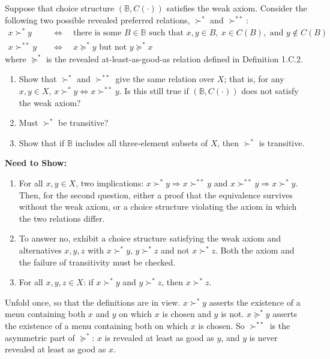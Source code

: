 \documentclass[12pt]{article}
\newenvironment{statement}{\par\medskip}{\par\medskip}
\newenvironment{nts}
  {\par\medskip\Needspace{3\baselineskip}%
   \noindent\textbf{Need to Show:}\par\nobreak\smallskip}
  {\par\medskip}
\begin{document}
\begin{statement}
  Suppose that choice structure $(\mathbb B,C(\cdot))$ satisfies the weak axiom.
  Consider the following two possible revealed preferred relations, $\succ^{*}$
  and $\succ^{**}$:
  \[
  \begin{aligned}
    x\succ^{*}y \quad&\Longleftrightarrow\quad
    \text{there is some }B\in\mathbb B\text{ such that }x,y\in B,\ x\in C(B),
    \text{ and } y\notin C(B)\\
    x\succ^{**}y \quad&\Longleftrightarrow\quad
    x\succeq^{*}y\text{ but not }y\succeq^{*}x
  \end{aligned}
  \]
  where $\succeq^{*}$ is the revealed at-least-as-good-as relation defined in
  Definition 1.C.2.
  \begin{enumerate}[label=(\alph*),leftmargin=2.4em,topsep=.3em,itemsep=.25em]
    \item Show that $\succ^{*}$ and $\succ^{**}$ give the same relation over $X$;
    that is, for any $x,y\in X$, $x\succ^{*}y\iff x\succ^{**}y$. Is this
    still true if $(\mathbb B,C(\cdot))$ does not satisfy the weak axiom?
    \item Must $\succ^{*}$ be transitive?
    \item Show that if $\mathbb B$ includes all three-element subsets of $X$,
    then $\succ^{*}$ is transitive.
  \end{enumerate}
\end{statement}

\begin{nts}
  \begin{enumerate}[label=(\alph*),leftmargin=2.4em,topsep=.2em,itemsep=.35em]
    \item For all $x,y\in X$, two implications:
    $x\succ^{*}y\Rightarrow x\succ^{**}y$ and
    $x\succ^{**}y\Rightarrow x\succ^{*}y$. Then, for the second question,
    either a proof that the equivalence survives without the weak axiom, or
    a choice structure violating the axiom in which the two relations
    differ.
    \item To answer no, exhibit a choice structure satisfying the weak axiom
    and alternatives $x,y,z$ with $x\succ^{*}y$, $y\succ^{*}z$ and not
    $x\succ^{*}z$. Both the axiom and the failure of transitivity must be
    checked.
    \item For all $x,y,z\in X$: if $x\succ^{*}y$ and $y\succ^{*}z$, then
    $x\succ^{*}z$.
  \end{enumerate}
  Unfold once, so that the definitions are in view. $x\succ^{*}y$ asserts the
  existence of a menu containing both $x$ and $y$ on which $x$ is chosen and
  $y$ is not. $x\succeq^{*}y$
  asserts the existence of a menu containing both on which $x$ is chosen. So
  $\succ^{**}$ is the asymmetric part of $\succeq^{*}$: $x$ is revealed at least
  as good as $y$, and $y$ is never revealed at least as good as $x$.
\end{nts}
\end{document}
